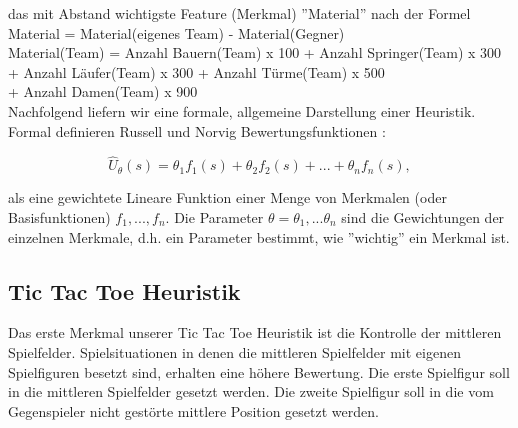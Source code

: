 das mit Abstand wichtigste Feature (Merkmal) ''Material'' nach der Formel \\

\tab \tab Material = Material(eigenes Team) - Material(Gegner) \\

Material(Team) = Anzahl Bauern(Team) x 100 + Anzahl Springer(Team) x 300 \\
\tab \tab \tab + Anzahl Läufer(Team) x 300 + Anzahl Türme(Team) x 500 \\
\tab \tab \tab + Anzahl Damen(Team) x 900 \\


Nachfolgend liefern wir eine formale, allgemeine Darstellung einer Heuristik. Formal definieren Russell und Norvig Bewertungsfunktionen \cite[218]{Russell}: 

\begin{equation*}
\hat{U}_\theta(s) = \theta_1 f_1(s) + \theta_2 f_2(s) + ... + \theta_n f_n(s),
\end{equation*}

als eine gewichtete Lineare Funktion einer Menge von Merkmalen (oder Basisfunktionen) $f_1, ..., f_n$. Die Parameter $\theta = \theta_1, ... \theta_n$ sind die Gewichtungen der einzelnen Merkmale, d.h. ein Parameter bestimmt, wie ''wichtig'' ein Merkmal ist.

\subsection{Tic Tac Toe Heuristik}
\label{subsec:Tic Tac Toe Heuristik}
Das erste Merkmal unserer Tic Tac Toe Heuristik ist die Kontrolle der mittleren Spielfelder. Spielsituationen in denen die mittleren Spielfelder mit eigenen Spielfiguren besetzt sind, erhalten eine höhere Bewertung. Die erste Spielfigur soll in die mittleren Spielfelder gesetzt werden. Die zweite Spielfigur soll in die vom Gegenspieler nicht gestörte mittlere Position gesetzt werden. \\

